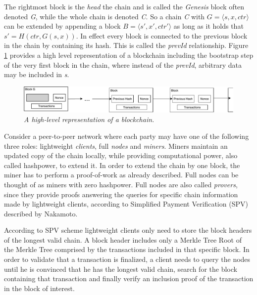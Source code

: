 \documentclass[10pt,a4paper]{article}
\theoremstyle{plain}
\theoremstyle{definition}
\theoremstyle{lemma}
\theoremstyle{corollary}
\begin{document}
The rightmost block is the \textit{head} the chain and is called the \textit{Genesis} block often
denoted \textit{G}, while the whole chain is denoted \textit{C}. So a chain \textit{C} with
$G = \langle s, x, ctr \rangle$ can be extended by appending a block $B = \langle s', x', ctr'
\rangle$ as long as it holds that $s' = H(ctr, G(s,x))$. In effect every block is connected to the
previous block in the chain by containing its hash. This is called the \textit{prevId} relationship.
Figure \ref{fig:abstract_chain} provides a high level representation of a blockchain including the
bootstrap step of the very first block in the chain, where instead of the \textit{prevId},
arbitrary data may be included in \textit{s}.

\begin{figure}[h!]
	\begin{center}
		\includegraphics[scale=0.7]{figures/abstract_chain.pdf}
	\end{center}
	\caption{\textit{A high-level representation of a blockchain. }}
	\label{fig:abstract_chain}
\end{figure}


Consider a peer-to-peer network where each party may have one of the following three roles:
lightweight \textit{clients}, full \textit{nodes} and \textit{miners}.
Miners maintain an updated copy of the chain locally, while providing computational power, also
called hashpower, to extend it. In order to extend the chain by one block, the miner has to perform
a proof-of-work as already described.
Full nodes can be thought of as miners with zero hashpower. Full nodes are also called
\textit{provers}, since they provide proofs  answering the queries for specific chain information
made by lightweight clients, according to Simplified Payment Verification (SPV) described by
Nakamoto\cite{Nakamoto}.

According to SPV scheme lightweight clients only need to store the block headers of the longest
valid chain. A block header includes only a Merkle Tree Root of the Merkle Tree comprised by
the transactions included in that specific block. In order to validate that a transaction is
finalized, a client needs to query the nodes until he is convinced that he has the longest
valid chain, search for the block containing that transaction and finally verify an inclusion
proof of the transaction in the block of interest.
\end{document}
